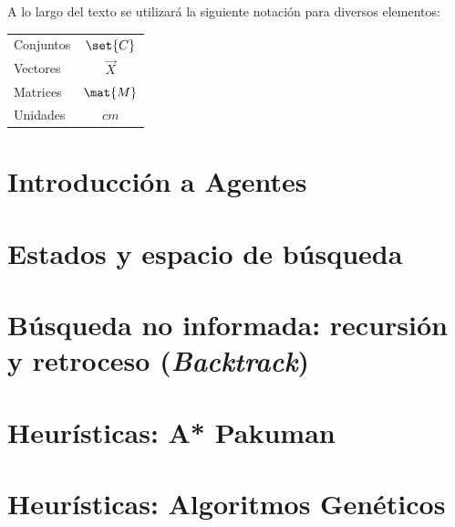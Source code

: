 \documentclass[12pt,openany]{book}
\begin{document}
A lo largo del texto se utilizará la siguiente notación para diversos elementos:
\begin{longtable}{lc}
 Conjuntos   &   $\set{C}$ \\
 Vectores    &   $\vec{X}$ \\
 Matrices    &   $\mat{M}$ \\
 Unidades    &   $\unit{cm}$
\end{longtable}



\chapter{Introducción a Agentes}





\chapter{Estados y espacio de búsqueda}





\chapter[Retroceso]{Búsqueda no informada: recursión y retroceso (\textit{Backtrack})}





\chapter{Heurísticas: A* Pakuman}





\chapter{Heurísticas: Algoritmos Genéticos}


\end{document}
